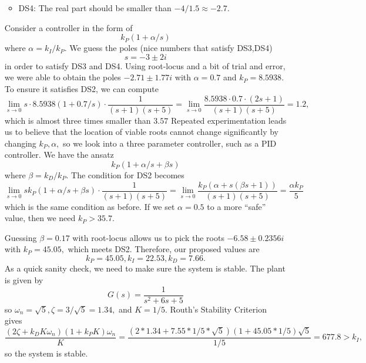 \documentclass{article}
\begin{document}
\begin{enumerate}[label=\textbf{3.\arabic*}]
\begin{itemize}
\begin{equation}
    \end{equation}
    \item DS4: The real part should be smaller than $-4/1.5 \approx -2.7.$
\end{itemize}
Consider a controller in the form of 
\begin{equation}
    k_P(1+\alpha/s)
\end{equation}
where $\alpha = k_I/k_P.$ We guess the poles (nice numbers that satisfy DS3,DS4) 
\begin{equation}
    s = -3 \pm 2 i
\end{equation}
in order to satisfy DS3 and DS4. Using root-locus and a bit of trial and error, we were able to obtain the poles $-2.71 \pm 1.77 i$ with $\alpha=0.7$ and $k_P=8.5938.$ To ensure it satisfies DS2, we can compute 
\begin{equation}
    \lim_{s\to 0} s \cdot 8.5938(1+0.7/s)\cdot \frac{1}{(s+1)(s+5)} = \lim_{s\to 0}\frac{8.5938 \cdot 0.7 \cdot (2 s + 1)}{(s + 1) (s + 5)} = 1.2,
\end{equation}
which is almost three times smaller than $3.57$ Repeated experimentation leads us to believe that the location of viable roots cannot change significantly by changing $k_P,\alpha,$ so we look into a three parameter controller, such as a PID controller. We have the ansatz
\begin{equation}
    k_P(1+\alpha/s+\beta s)
\end{equation}
where $\beta = k_D/k_P.$ The condition for DS2 becomes 
\begin{equation}
    \lim_{s\to 0} s k_P(1+\alpha/s+\beta s) \cdot \frac{1}{(s+1)(s+5)} = \lim_{s\to 0}\frac{k_{P} (\alpha + s (\beta s + 1))}{(s + 1) (s + 5)} = \frac{\alpha k_{P}}{5}
\end{equation}
which is the same condition as before. If we set $\alpha=0.5$ to a more ``safe'' value, then we need $k_P>35.7.$

Guessing $\beta=0.17$ with root-locus allows us to pick the roots $-6.58 \pm 0.2356i$ with $k_P=45.05,$ which meets DS2. Therefore, our proposed values are 
\begin{equation}
    \boxed{k_P = 45.05, k_I = 22.53, k_D = 7.66}.
\end{equation}
As a quick sanity check, we need to make sure the system is stable. The plant is given by 
\begin{equation}
    G(s) = \frac{1}{s^2+6s+5}
\end{equation}
so $\omega_n = \sqrt{5}, \zeta = 3/\sqrt{5} = 1.34,$ and $K=1/5.$ Routh's Stability Criterion gives
\begin{equation}
    \frac{(2\zeta+k_DK\omega_n)(1+k_PK)\omega_n}{K} = \frac{(2*1.34+7.55*1/5*\sqrt{5})(1+45.05*1/5)\sqrt{5}}{1/5} = 677.8 > k_I,
\end{equation}
so the system is stable.


\end{enumerate}
\end{document}
